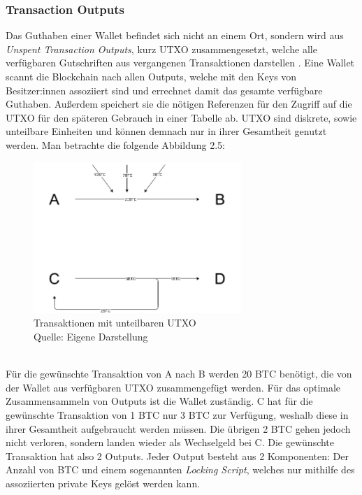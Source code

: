 \subsubsection{Transaction Outputs}
Das Guthaben einer Wallet befindet sich nicht an einem Ort, sondern wird aus \emph{Unspent Transaction Outputs}, kurz UTXO zusammengesetzt, welche alle verfügbaren Gutschriften aus vergangenen Transaktionen darstellen \cite[]{antanopoulos_2014}.
Eine Wallet scannt die Blockchain nach allen Outputs, welche mit den Keys von Besitzer:innen assoziiert sind und errechnet damit das gesamte verfügbare Guthaben. Außerdem speichert sie die nötigen Referenzen für den Zugriff auf die UTXO für den späteren Gebrauch in einer Tabelle ab. UTXO sind diskrete, sowie unteilbare Einheiten und können demnach nur in ihrer Gesamtheit genutzt werden. Man betrachte die folgende Abbildung 2.5:
\begin{figure}[htpb]
	\centering
	\includegraphics[width=0.7\textwidth]{images/UTXO.png}
	\caption{Transaktionen mit unteilbaren UTXO\\
	Quelle: Eigene Darstellung}
	\label{6braun:fig:Transaktionen}
\end{figure}\\
Für die gewünschte Transaktion von A nach B werden 20 BTC benötigt, die von der Wallet aus verfügbaren UTXO zusammengefügt werden. 
Für das optimale Zusammensammeln von Outputs ist die Wallet zuständig.
C hat für die gewünschte Transaktion von 1 BTC nur 3 BTC zur Verfügung, weshalb diese in ihrer Gesamtheit aufgebraucht werden müssen.
Die übrigen 2 BTC gehen jedoch nicht verloren, sondern landen wieder als Wechselgeld bei C. 
Die gewünschte Transaktion hat also 2 Outputs.
Jeder Output besteht aus 2 Komponenten: Der Anzahl von BTC und einem sogenannten \emph{Locking Script}, welches nur mithilfe des assoziierten private Keys gelöst werden kann.

